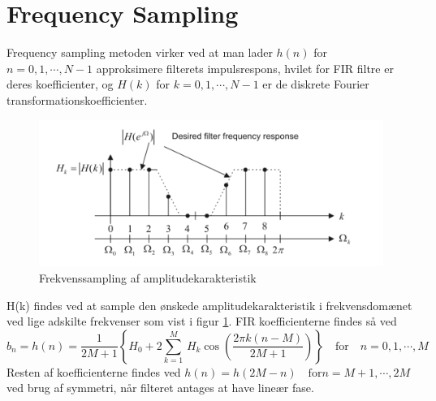 \section{Frequency Sampling}
Frequency sampling metoden virker ved at man lader $h(n)$ for $n = 0, 1, \cdots, N - 1$ approksimere filterets impulsrespons, hvilet for FIR filtre er deres koefficienter, og $H(k)$ for $k = 0, 1, \cdots, N - 1$ er de diskrete Fourier transformationskoefficienter.
\begin{figure}[!ht]
	\includegraphics[width=\textwidth]{billeder/frequencysampling.png}
	\caption{Frekvenssampling af amplitudekarakteristik}
	\label{fig:frequencysampling}
\end{figure}
H(k) findes ved at sample den ønskede amplitudekarakteristik i frekvensdomænet ved lige adskilte frekvenser som vist i figur \ref{fig:frequencysampling}.
FIR koefficienterne findes så ved
\begin{equation} \label{eq:fir_koefficienter}
b_n = h(n) = \frac{1}{2M + 1} \left\{H_0 + 2\displaystyle\sum_{k = 1}^{M}\, H_k\cos\left(\frac{2\pi k (n - M)}{2M + 1} \right) \right\} \quad \mathrm{for} \quad n = 0, 1, \cdots, M
\end{equation}
Resten af koefficienterne findes ved $h(n) = h(2M - n) \quad \mathrm{for} n = M + 1, \cdots, 2M$ ved brug af symmetri, når filteret antages at have lineær fase.


